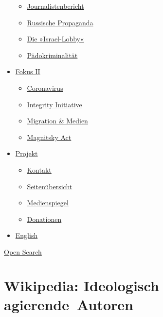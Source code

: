 \begin{itemize}
  \begin{itemize}
  \tightlist
  \item
    \href{https://swprs.org/bericht-eines-journalisten/}{Journalistenbericht}
  \item
    \href{https://swprs.org/russische-propaganda/}{Russische Propaganda}
  \item
    \href{https://swprs.org/die-israel-lobby-fakten-und-mythen/}{Die
    »Israel-Lobby«}
  \item
    \href{https://swprs.org/geopolitik-und-paedokriminalitaet/}{Pädokriminalität}
  \end{itemize}
\item
  \href{https://swprs.org/migration-und-medien/}{Fokus II}

  \begin{itemize}
  \tightlist
  \item
    \href{https://swprs.org/covid-19-hinweis-ii/}{Coronavirus}
  \item
    \href{https://swprs.org/die-integrity-initiative/}{Integrity
    Initiative}
  \item
    \href{https://swprs.org/migration-und-medien/}{Migration \& Medien}
  \item
    \href{https://swprs.org/der-fall-magnitsky/}{Magnitsky Act}
  \end{itemize}
\item
  \href{https://swprs.org/kontakt/}{Projekt}

  \begin{itemize}
  \tightlist
  \item
    \href{https://swprs.org/kontakt/}{Kontakt}
  \item
    \href{https://swprs.org/uebersicht/}{Seitenübersicht}
  \item
    \href{https://swprs.org/medienspiegel/}{Medienspiegel}
  \item
    \href{https://swprs.org/donationen/}{Donationen}
  \end{itemize}
\item
  \href{https://swprs.org/contact/}{English}
\end{itemize}

\protect\hyperlink{}{Open Search}

\hypertarget{wikipedia-ideologisch-agierende-autoren}{%
\section{Wikipedia: Ideologisch
agierende~Autoren}\label{wikipedia-ideologisch-agierende-autoren}}

